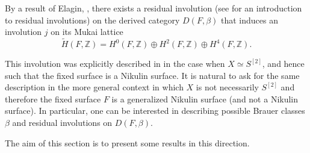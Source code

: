 \documentclass{amsart}
\theoremstyle{definition}
\numberwithin{equation}{section}
\numberwithin{equation}{section} \theoremstyle{definition}
\newcommand\ZZ{{\mathbb Z}}
\begin{document}
By a result of Elagin, \cite[Theorem 1.3]{El}, there exists a residual involution (see \cite{KP} for an introduction to residual involutions) on the derived category $D(F,\beta)$ that induces an involution $j$
on its Mukai lattice $$\tilde{H}(F,\ZZ)=H^0(F,\ZZ)\oplus H^2(F,\ZZ)\oplus H^4(F,\ZZ).$$

This involution was explicitly described in \cite[Section 7.2]{BO} in the case when $X\simeq S^{[2]}$, and hence such that the fixed surface is a Nikulin surface. It is natural to ask for the same description in the more general context in which $X$ is not necessarily $S^{[2]}$ and therefore the fixed surface $F$ is a generalized Nikulin surface (and not a Nikulin surface).
In particular, one can be interested in describing possible Brauer classes $\beta$ and 
residual involutions on $D(F,\beta)$.

The aim of this section is to present some results in this direction.
\end{document}

